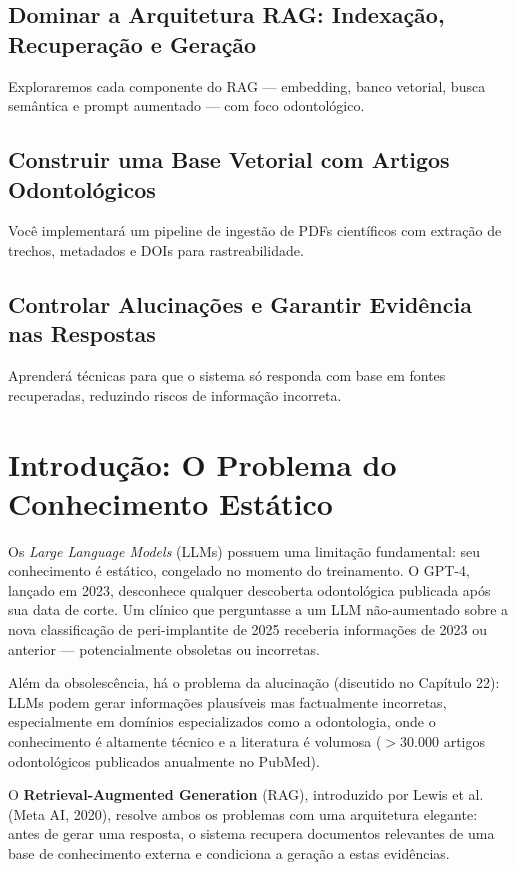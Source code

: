 \subsection{Dominar a Arquitetura RAG: Indexação, Recuperação e Geração}
Exploraremos cada componente do RAG --- embedding, banco vetorial, busca semântica e prompt aumentado --- com foco odontológico.

\subsection{Construir uma Base Vetorial com Artigos Odontológicos}
Você implementará um pipeline de ingestão de PDFs científicos com extração de trechos, metadados e DOIs para rastreabilidade.

\subsection{Controlar Alucinações e Garantir Evidência nas Respostas}
Aprenderá técnicas para que o sistema só responda com base em fontes recuperadas, reduzindo riscos de informação incorreta.

\section{Introdução: O Problema do Conhecimento Estático}

Os \textit{Large Language Models} (LLMs) possuem uma limitação fundamental: seu conhecimento é estático, congelado no momento do treinamento. O GPT-4, lançado em 2023, desconhece qualquer descoberta odontológica publicada após sua data de corte. Um clínico que perguntasse a um LLM não-aumentado sobre a nova classificação de peri-implantite de 2025 receberia informações de 2023 ou anterior --- potencialmente obsoletas ou incorretas.

Além da obsolescência, há o problema da alucinação (discutido no Capítulo 22): LLMs podem gerar informações plausíveis mas factualmente incorretas, especialmente em domínios especializados como a odontologia, onde o conhecimento é altamente técnico e a literatura é volumosa ($> 30.000$ artigos odontológicos publicados anualmente no PubMed).

O \textbf{Retrieval-Augmented Generation} (RAG), introduzido por Lewis et al. (Meta AI, 2020), resolve ambos os problemas com uma arquitetura elegante: antes de gerar uma resposta, o sistema recupera documentos relevantes de uma base de conhecimento externa e condiciona a geração a estas evidências.

